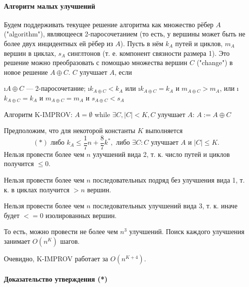 \paragraph{Алгоритм малых улучшений}
Будем поддерживать текущее решение алгоритма как множество рёбер $A$ ("algorithm"), являющееся 2-паросочетанием (то есть, у вершины может быть не более двух инцидентных ей рёбер из $A$). Пусть в нём $k_A$ путей и циклов, $m_A$ вершин в циклах, $s_A$ синглтонов (т. е. компонент связности размера 1). Это решение можно преобразовать с помощью множества вершин $C$ ("change") в новое решение $A \oplus C$. $C$ улучшает $A$, если 
\begin{enumerate}
	\i $A \oplus C$ --- 2-паросочетание;
	\i $k_{A \oplus C} < k_A$ или
	\i $k_{A \oplus C} = k_A$ и $m_{A \oplus C} > m_A$, или
	\i $k_{A \oplus C} = k_A$ и $m_{A \oplus C} = m_A$ и $s_{A \oplus C} < s_A$
\end{enumerate}

Алгоритм K-IMPROV:
$A = \emptyset$
while $\exists C, |C|<K, C$ улучшает $A$:
$A := A \oplus C$

Предположим, что для некоторой константы $K$ выполняется 
$$(*) \text{ либо } k_A \le \frac{1}{7}n+\frac{8}{7}k^*, \text{ либо } \exists C: C \text{ улучшает } A \textbf{ и } |C|\le K.$$
Нельзя провести более чем $n$ улучшений вида 2, т. к. число путей и циклов получится $\le0$.

Нельзя провести более чем $n$ последовательных подряд без улучшения вида 1, т. к. в циклах получится $>n$ вершин.

Нельзя провести более чем $n$ последовательных улучшений вида 3, т. к. иначе будет $<= 0$ изолированных вершин. 

То есть, можно провести не более чем $n^3$ улучшений. Поиск каждого улучшения занимает $O(n^K)$ шагов.

Очевидно, K-IMPROV работает за $O(n^{K+4})$. 

\paragraph{Доказательство утверждения (*)}



